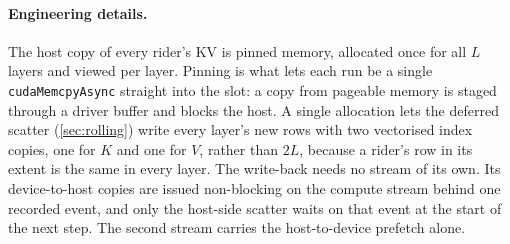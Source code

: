\paragraph{Engineering details.} The host copy of every rider's KV is pinned
memory, allocated once for all $L$ layers and viewed per layer. Pinning is what
lets each run be a single \texttt{cudaMemcpyAsync} straight into the slot: a
copy from pageable memory is staged through a driver buffer and blocks the
host. A single allocation lets the deferred scatter
(\cref{sec:rolling}) write every layer's new rows with two vectorised index
copies, one for $K$ and one for $V$, rather than $2L$, because a rider's row
in its extent is the same in every layer. The write-back needs no stream of
its own. Its device-to-host copies are issued non-blocking on the compute
stream behind one recorded event, and only the host-side scatter waits on that
event at the start of the next step. The second stream carries the
host-to-device prefetch alone.
